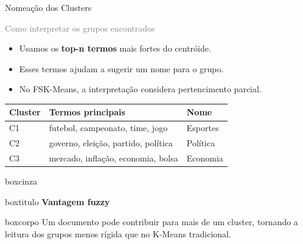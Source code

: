 \documentclass[aspectratio=43]{beamer}
\begin{document}
\begin{frame}[t]{Nomeação dos Clusters}

\textcolor{gray}{\large Como interpretar os grupos encontrados}

\vspace{0.2cm}

\begin{itemize}
    \item Usamos os \textbf{top-n termos} mais fortes do centróide.
    \item Esses termos ajudam a sugerir um nome para o grupo.
    \item No FSK-Means, a interpretação considera pertencimento parcial.
\end{itemize}

\vspace{0.2cm}

\scriptsize
\renewcommand{\arraystretch}{1.2}
\begin{center}
\begin{tabular}{P{1.3cm} P{4.8cm} P{2.6cm}}
\toprule
\textbf{Cluster} & \textbf{Termos principais} & \textbf{Nome} \\
\midrule
C1 & futebol, campeonato, time, jogo & Esportes \\
C2 & governo, eleição, partido, política & Política \\
C3 & mercado, inflação, economia, bolsa & Economia \\
\bottomrule
\end{tabular}
\end{center}

\vspace{0.2cm}

\begin{center}
\begin{beamercolorbox}[wd=0.82\paperwidth, sep=0pt]{boxcinza}
  \begin{beamercolorbox}[wd=0.82\paperwidth, ht=0.42cm, dp=0.08cm, leftskip=0.2cm]{boxtitulo}
    {\color{uelgreen}\scriptsize\textbf{Vantagem fuzzy}}
  \end{beamercolorbox}
  \begin{beamercolorbox}[wd=0.82\paperwidth, sep=0.18cm]{boxcorpo}
    \scriptsize
    Um documento pode contribuir para mais de um cluster, tornando a leitura dos grupos menos rígida que no K-Means tradicional.
  \end{beamercolorbox}
\end{beamercolorbox}
\end{center}

\end{frame}
\end{document}
